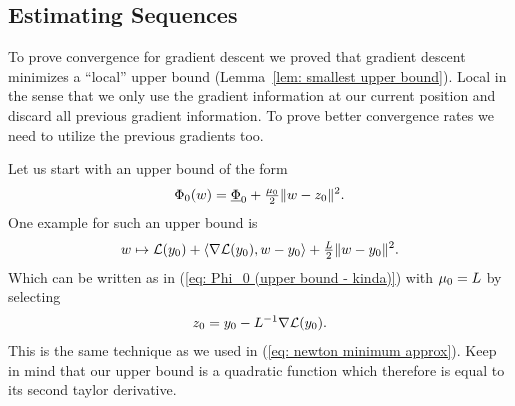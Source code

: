 \subsection{Estimating Sequences}

To prove convergence for gradient descent we proved that gradient descent
minimizes a ``local'' upper bound (Lemma~\ref{lem: smallest upper bound}). Local
in the sense that we only use the gradient information at our current position
and discard all previous gradient information. To prove better convergence rates
we need to utilize the previous gradients too.

Let us start with an upper bound of the form
%
\begin{align}\label{eq: Phi_0 (upper bound - kinda)}
	\Phi_0(w) = \underline{\Phi}_0 + \tfrac{\mu_0}{2}\|w-z_0\|^2.
\end{align}
%
One example for such an upper bound is
%
\begin{align*}
	w \mapsto
	\mathcal{L}(y_0)
	+ \langle\nabla\mathcal{L}(y_0), w - y_0\rangle
	+ \tfrac{L}{2}\|w -y_0\|^2.
\end{align*}
%
Which can be written as in (\ref{eq: Phi_0 (upper bound - kinda)}) with
\(\mu_0=L\) by selecting
%
\begin{align*}
	z_0 = y_0 - L^{-1}\nabla\mathcal{L}(y_0).
\end{align*}
This is the same technique as we used in (\ref{eq: newton minimum approx}). Keep
in mind that our upper bound is a quadratic function which therefore
is equal to its second taylor derivative.

